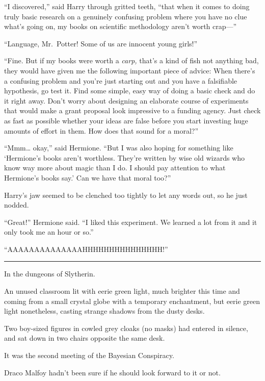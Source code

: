 ``I discovered,'' said Harry through gritted teeth, ``that when it comes
to doing truly basic research on a genuinely confusing problem where you
have no clue what's going on, my books on scientific methodology aren't
worth crap---''

``Language, Mr.~Potter! Some of us are innocent young girls!''

``Fine. But if my books were worth a \emph{carp,} that's a kind of fish
not anything bad, they would have given me the following important piece
of advice: When there's a confusing problem and you're just starting out
and you have a falsifiable hypothesis, go test it. Find some simple,
easy way of doing a basic check and do it right away. Don't worry about
designing an elaborate course of experiments that would make a grant
proposal look impressive to a funding agency. Just check as fast as
possible whether your ideas are false before you start investing huge
amounts of effort in them. How does that sound for a moral?''

``Mmm\ldots{} okay,'' said Hermione. ``But I was also hoping for
something like `Hermione's books aren't worthless. They're written by
wise old wizards who know way more about magic than I do. I should pay
attention to what Hermione's books say.' Can we have that moral too?''

Harry's jaw seemed to be clenched too tightly to let any words out, so
he just nodded.

``Great!'' Hermione said. ``I liked this experiment. We learned a lot
from it and it only took me an hour or so.''

``AAAAAAAAAAAAAAHHHHHHHHHHHHHHH!''

\begin{center}\rule{3in}{0.4pt}\end{center}

In the dungeons of Slytherin.

An unused classroom lit with eerie green light, much brighter this time
and coming from a small crystal globe with a temporary enchantment, but
eerie green light nonetheless, casting strange shadows from the dusty
desks.

Two boy-sized figures in cowled grey cloaks (no masks) had entered in
silence, and sat down in two chairs opposite the same desk.

It was the second meeting of the Bayesian Conspiracy.

Draco Malfoy hadn't been sure if he should look forward to it or not.

